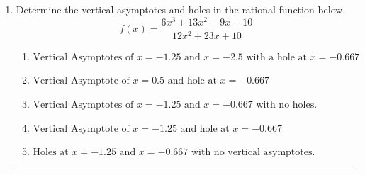 \documentclass[14pt]{extbook}
\newcommand{\litem}[1]{\item#1\hspace*{-1cm}\rule{\textwidth}{0.4pt}}
\begin{document}
\begin{enumerate}
{\begin{enumerate}[label=\Alph*.]
\end{enumerate} }
\litem{
Determine the vertical asymptotes and holes in the rational function below.\[ f(x) = \frac{6x^{3} +13 x^{2} -9 x -10}{12x^{2} +23 x + 10} \]\begin{enumerate}[label=\Alph*.]
\item \( \text{Vertical Asymptotes of } x = -1.25 \text{ and } x = -2.5 \text{ with a hole at } x = -0.667 \)
\item \( \text{Vertical Asymptote of } x = 0.5 \text{ and hole at } x = -0.667 \)
\item \( \text{Vertical Asymptotes of } x = -1.25 \text{ and } x = -0.667 \text{ with no holes.} \)
\item \( \text{Vertical Asymptote of } x = -1.25 \text{ and hole at } x = -0.667 \)
\item \( \text{Holes at } x = -1.25 \text{ and } x = -0.667 \text{ with no vertical asymptotes.} \)

\end{enumerate} }
\end{enumerate}
\end{document}

